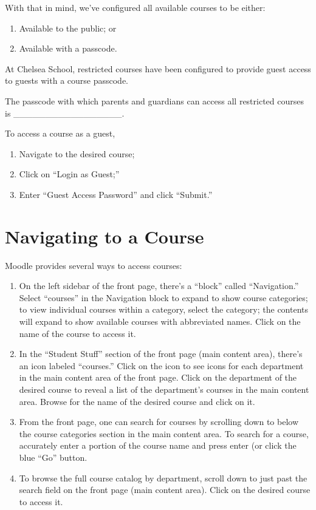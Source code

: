 \documentclass[letterpaper,10pt,english]{sphinxmanual}
\begin{document}
With that in mind, we've configured all available courses to be either:
\begin{enumerate}
\item {} 
Available to the public; or

\item {} 
Available with a passcode.

\end{enumerate}

At Chelsea School, restricted courses have been configured to provide guest access to guests with a course passcode.

The passcode with which parents and guardians can access all restricted courses is \_\_\_\_\_\_\_\_\_\_\_\_\_\_\_\_\_.

To access a course as a guest,
\begin{enumerate}
\item {} 
Navigate to the desired course;

\item {} 
Click on ``Login as Guest;''

\item {} 
Enter ``Guest Access Password'' and click ``Submit.''

\end{enumerate}


\section{Navigating to a Course}
\label{moodle:navigating-to-a-course}
Moodle provides several ways to access courses:
\begin{enumerate}
\item {} 
On the left sidebar of the front page, there's a ``block'' called ``Navigation.'' Select ``courses'' in the Navigation block to expand to show course categories; to view individual courses within a category, select the category; the contents will expand to show available courses with abbreviated names. Click on the name of the course to access it.

\item {} 
In the ``Student Stuff'' section of the front page (main content area), there's an icon labeled ``courses.'' Click on the icon to see icons for each department in the main content area of the front page. Click on the department of the desired course to reveal a list of the department's courses in the main content area. Browse for the name of the desired course and click on it.

\item {} 
From the front page, one can search for courses by scrolling down to below the course categories section in the main content area. To search for a course, accurately enter a portion of the course name and press enter (or click the blue ``Go'' button.

\item {} 
To browse the full course catalog by department, scroll down to just past the search field on the front page (main content area). Click on the desired course to access it.

\end{enumerate}
\end{document}

